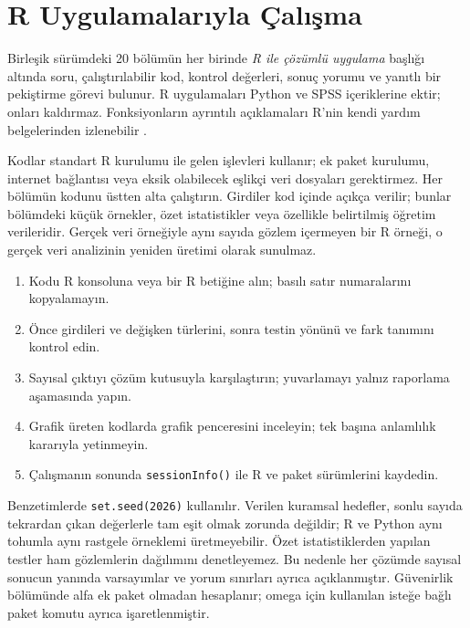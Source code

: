 \chapter*{R Uygulamalarıyla Çalışma}
\label{sec:r-guide}

Birleşik sürümdeki 20 bölümün her birinde
\emph{R ile çözümlü uygulama} başlığı altında soru, çalıştırılabilir kod,
kontrol değerleri, sonuç yorumu ve yanıtlı bir pekiştirme görevi bulunur.
R uygulamaları Python ve SPSS içeriklerine ektir; onları kaldırmaz.
Fonksiyonların ayrıntılı açıklamaları R'nin kendi yardım belgelerinden
izlenebilir \citep{rstatsmanual}.

Kodlar standart R kurulumu ile gelen işlevleri kullanır; ek paket kurulumu,
internet bağlantısı veya eksik olabilecek eşlikçi veri dosyaları gerektirmez.
Her bölümün kodunu üstten alta çalıştırın. Girdiler kod içinde açıkça verilir;
bunlar bölümdeki küçük örnekler, özet istatistikler veya özellikle belirtilmiş
öğretim verileridir. Gerçek veri örneğiyle aynı sayıda gözlem içermeyen bir
R örneği, o gerçek veri analizinin yeniden üretimi olarak sunulmaz.

\begin{enumerate}
  \item Kodu R konsoluna veya bir R betiğine alın; basılı satır numaralarını kopyalamayın.
  \item Önce girdileri ve değişken türlerini, sonra testin yönünü ve fark tanımını kontrol edin.
  \item Sayısal çıktıyı çözüm kutusuyla karşılaştırın; yuvarlamayı yalnız raporlama aşamasında yapın.
  \item Grafik üreten kodlarda grafik penceresini inceleyin; tek başına anlamlılık kararıyla yetinmeyin.
  \item Çalışmanın sonunda \texttt{sessionInfo()} ile R ve paket sürümlerini kaydedin.
\end{enumerate}

Benzetimlerde \texttt{set.seed(2026)} kullanılır. Verilen kuramsal hedefler,
sonlu sayıda tekrardan çıkan değerlerle tam eşit olmak zorunda değildir;
R ve Python aynı tohumla aynı rastgele örneklemi üretmeyebilir. Özet
istatistiklerden yapılan testler ham gözlemlerin dağılımını denetleyemez.
Bu nedenle her çözümde sayısal sonucun yanında varsayımlar ve yorum sınırları
ayrıca açıklanmıştır. Güvenirlik bölümünde alfa ek paket olmadan hesaplanır;
omega için kullanılan isteğe bağlı paket komutu ayrıca işaretlenmiştir.